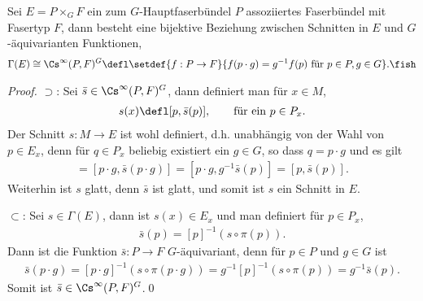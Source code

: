 \documentclass[%
	paper=a5,%
	fleqn,%
	DIV=18,%
	BCOR=0mm,
	fontsize=11pt,
	titlepage=false,%
	bibliography=totoc,
	DIV=18,%
	twoside=true,
	pdftitle=Riemannsche Geometrie,
	pdfauthor=Uwe Semmelmann,
	numbers=noendperiod]%
	{scrbook}
\begin{document}
\begin{lem}
Sei $E = P\times_G F$ ein zum $G$-Hauptfaserbündel $P$ assoziiertes
Faserbündel mit Fasertyp $F$, dann besteht eine bijektive Beziehung zwischen
Schnitten in $E$ und $G$-äquivarianten Funktionen,
\begin{align*}
\Gamma(E) \cong \Cs^\infty(P,F)^G \defl
\setdef{f : P\to F}{f(p\cdot g) = g^{-1}f(p)\text{ für }p\in P,g\in G}.\fish
\end{align*}
\end{lem}
\begin{proof}
$\supset$: Sei $\bar{s}\in \Cs^\infty(P,F)^G$, dann definiert man für $x\in M$,
\begin{align*}
s(x) \defl [p,\bar{s}(p)],\qquad \text{für ein }p\in P_x.
\end{align*}
Der Schnitt $s\colon M\to E$ ist wohl definiert, d.h. unabhängig von der Wahl von $p \in E_x$,
denn für $q\in P_x$ beliebig existiert ein
$g\in G$, so dass $q = p\cdot g$ und es gilt
\begin{align*}
[q,\bar{s}(q)] = [p\cdot g,\bar{s}(p\cdot g)]
= [p\cdot g,g^{-1}\bar{s}(p)] = [p,\bar{s}(p)].
\end{align*}
Weiterhin ist $s$ glatt, denn $\bar{s}$ ist glatt, und somit ist $s$ ein Schnitt
in $E$.

$\subset$: Sei $s\in \Gamma(E)$, dann ist $s(x) \in E_x$ und man definiert für
$p\in P_x$,
\begin{align*}
\bar{s}(p) = [p]^{-1}(s\circ \pi(p)). 
\end{align*}
Dann ist die Funktion $\bar{s}\colon P\to F$ $G$-äquivariant, denn für $p\in P$ und
$g\in G$ ist
\begin{align*}
\bar{s}(p\cdot g) = [p\cdot g]^{-1}(s\circ \pi(p\cdot g))
= g^{-1}[p]^{-1}(s\circ \pi(p)) = g^{-1}\bar{s}(p).
\end{align*} 
Somit ist $\bar{s}\in \Cs^\infty(P,F)^G$.\qed
\end{proof}
\end{document}
